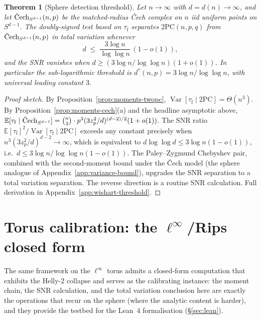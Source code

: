 \documentclass[reqno,12pt]{amsart}
\newcommand{\tauf}{\tau_{\mathrm{f}}}
\newcommand{\PC}{\mathrm{2PC}}
\newcommand{\Cech}{\ifmmode\text{\v{C}ech}\else\v{C}ech\fi}  %
\newcommand{\EE}{\mathbb{E}}
\DeclareMathOperator{\Var}{Var}
\theoremstyle{plain}
\newtheorem{theorem}{Theorem}[section]
\theoremstyle{definition}
\theoremstyle{remark}
\begin{document}
\begin{theorem}[Sphere detection threshold]\label{thm:sphere-detection}
Let $n \to \infty$ with $d = d(n) \to \infty$, and let $\Cech_{S^{d-1}}(n, p)$ be the
matched-radius \v{C}ech complex on $n$ iid uniform points on $S^{d-1}$. The
doubly-signed test based on $\tauf$ separates $\PC(n, p, q)$ from
$\Cech_{S^{d-1}}(n, p)$ in total variation whenever
\[
  d \;\le\; \frac{3 \log n}{\log \log n}\,(1 - o(1)),
\]
and the SNR vanishes when $d \ge (3 \log n / \log \log n)(1 + o(1))$. In particular
the sub-logarithmic threshold is $d^*(n, p) = 3 \log n / \log \log n$, with universal
leading constant $3$.
\end{theorem}

\begin{proof}[Proof sketch] By Proposition~\ref{prop:moments-twopc},
$\Var[\tauf \mid \PC] = \Theta(n^3)$. By Proposition~\ref{prop:moments-cech}(a) and the
headline asymptotic above, $\EE[\tauf \mid \Cech_{S^{d-1}}] = \binom{n}{3} \cdot p^3
(3 z_p^2 / d)^{(d-2)/2}(1 + o(1))$. The SNR ratio
$\EE[\tauf]^2 / \Var[\tauf \mid \PC]$ exceeds any constant precisely when
$n^3 (3 z_p^2 / d)^{d-2} \to \infty$, which is equivalent to
$d \log \log d \le 3 \log n (1 - o(1))$, i.e.\ $d \le 3 \log n / \log \log n (1 - o(1))$.
The Paley--Zygmund Chebyshev pair, combined with the second-moment bound under the
\v{C}ech model (the sphere analogue of Appendix~\ref{app:variance-bound}), upgrades the
SNR separation to a total variation separation. The reverse direction is a routine SNR
calculation. Full derivation in Appendix~\ref{app:wishart-threshold}.
\end{proof}

\section{Torus calibration: the $\ell^\infty$/Rips closed form}\label{sec:torus-calibration}\label{sec:linfty-detection}\label{sec:detection}

The same framework on the $\ell^\infty$ torus admits a closed-form computation that
exhibits the Helly-2 collapse and serves as the calibrating instance: the moment
chain, the SNR calculation, and the total variation conclusion here are exactly the
operations that recur on the sphere (where the analytic content is harder), and they
provide the testbed for the Lean~4 formalisation
(\S\ref{sec:lean}).
\end{document}
